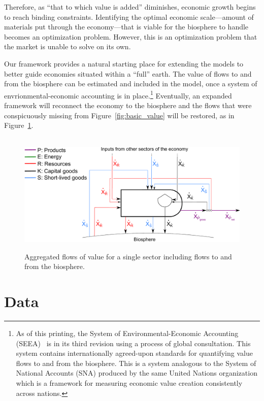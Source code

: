 Therefore, as ``that to which value is added'' diminishes, 
economic growth begins to reach binding constraints. 
Identifying the optimal economic 
scale---amount of materials put through the economy---that 
is viable for the biosphere to handle becomes an optimization problem. 
However, this is an optimization 
problem that the market is unable to solve on its own. 

Our framework provides a natural starting place for extending the models to better
guide economies situated within a ``full'' earth. 
The value of flows to and from the biosphere can be estimated and included in the model, 
once a system of envrionmental-economic accounting is in place.\footnote{As of this printing, 
	the System of Environmental-Economic Accounting (SEEA)~\cite{UNSEEA:aa}
	is in its third revision 
	using a process of global consultation. 
	This system contains internationally agreed-upon standards for quantifying value flows 
	to and from the biosphere. 
	This is a system analogous to the System of National Accounts (SNA) 
	produced by the same United Nations organization
	which is a framework for measuring economic value creation consistently across nations.} 
Eventually, an expanded framework will reconnect the economy to the biosphere 
and the flows that were conspicuously 
missing from Figure~\ref{fig:basic_value} will
be restored, as in Figure~\ref{fig:basic_value_with_biosphere_flows}.

\begin{figure}[ht!]
\centering\
\includegraphics[width=0.8\linewidth]{Part_3/Chapter_Unfinished/images/PERKS_basic_unit_value_with_biosphere_flows.pdf}
\caption[Aggregated flows of value for a single sector including flows to and from the biosphere]{Aggregated flows of value for a single sector including flows to and from the biosphere.}
\label{fig:basic_value_with_biosphere_flows}
\end{figure}


\section{Data}
\label{sec:Data}

